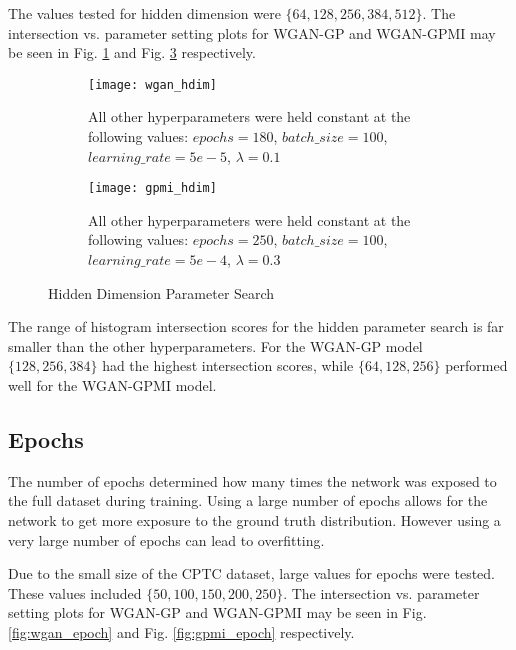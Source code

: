 The values tested for hidden dimension were $\{64, 128, 256, 384, 512\}$. The intersection vs. parameter setting plots for WGAN-GP and WGAN-GPMI may be seen in Fig. \ref{fig:wgan_hdim} and Fig. \ref{fig:gpmi_hdim} respectively.

\begin{figure}[!htbp]
	\centering
	\begin{subfigure}{.7\textwidth}
		\texttt{[image: wgan\_hdim]}
	\end{subfigure}%
	\begin{subfigure}{.3\textwidth}
		\caption{
			All other hyperparameters were held constant at the following values: $epochs=180$, $batch\_size = 100$, $learning\_rate=5e-5$, $\lambda=0.1$
		}
		\label{fig:wgan_hdim}
	\end{subfigure}%

	\begin{subfigure}{.7\textwidth}
		\texttt{[image: gpmi\_hdim]}
	\end{subfigure}%
	\begin{subfigure}{.3\textwidth}
		\caption{
			All other hyperparameters were held constant at the following values: $epochs=250$, $batch\_size=100$, $learning\_rate=5e-4$, $\lambda=0.3$
		}
		\label{fig:gpmi_hdim}
	\end{subfigure}%
	\caption{Hidden Dimension Parameter Search}
\end{figure}


The range of histogram intersection scores for the hidden parameter search is far smaller than the other hyperparameters. For the WGAN-GP model $\{128, 256, 384\}$ had the highest intersection scores, while $\{64,128,256\}$ performed well for the WGAN-GPMI model.


\subsection{Epochs}
\label{sec:epoch}

The number of epochs determined how many times the network was exposed to the full dataset during training. Using a large number of epochs allows for the network to get more exposure to the ground truth distribution. However using a very large number of epochs can lead to overfitting.

Due to the small size of the CPTC dataset, large values for epochs were tested. These values included $\{50, 100, 150, 200, 250\}$. The intersection vs. parameter setting plots for WGAN-GP and WGAN-GPMI may be seen in Fig. \ref{fig:wgan_epoch} and Fig. \ref{fig:gpmi_epoch} respectively.

